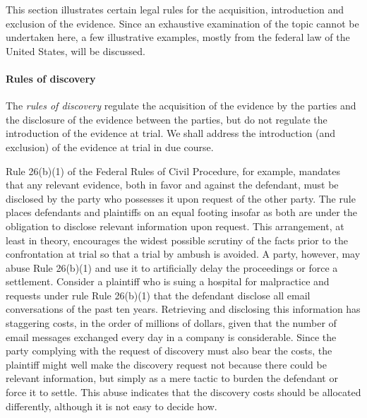 \documentclass[10pt]{article}
\begin{document}
This section illustrates certain legal rules for the acquisition, introduction and exclusion of the evidence. Since an exhaustive examination of the topic cannot be undertaken here, a few illustrative examples, mostly from the federal law of the United States, will be discussed. 




\paragraph{Rules of discovery}
The \textit{rules of discovery} %
regulate the acquisition of the evidence by the parties and the disclosure 
of the evidence between the parties, but do not regulate the introduction of the evidence at trial. %
We shall address the introduction (and exclusion) of the evidence at trial in due course. 
 
 
 
 Rule 26(b)(1) of the Federal Rules of Civil Procedure, for example, mandates that any relevant evidence, both in favor and against the defendant, must be disclosed by the party who possesses it upon request of the other party. The rule places defendants and plaintiffs on an equal footing insofar as both are under the obligation to disclose relevant information upon request. This arrangement, at least in theory, 
 encourages the widest possible scrutiny of the facts prior to the confrontation at trial so that a trial by ambush is avoided.
 A party, however, may abuse Rule 26(b)(1) and use it to artificially delay the proceedings or force a settlement. 
Consider a plaintiff who is suing a hospital for malpractice and requests under rule Rule 26(b)(1) that the defendant 
disclose all email conversations of the past ten years. Retrieving and disclosing this information has staggering costs, in the order of millions of dollars, given that the number of email messages exchanged every day in a company is considerable. Since the party complying with the request of discovery must also bear the costs, the plaintiff might well make the discovery request not because there could be relevant information, but simply as a mere tactic to burden the defendant or force it to settle.  This  abuse indicates that the discovery costs should be allocated differently, although it is not easy to decide how. 
\end{document}
